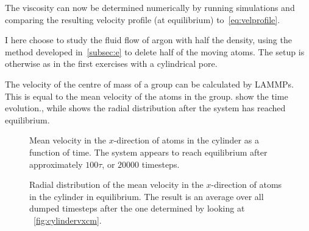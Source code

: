 \documentclass[11pt,british,a4paper]{report}
\begin{document}
The viscosity can now be determined numerically by running simulations and comparing the resulting velocity profile (at equilibrium) to~\vref{eq:velprofile}.

I here choose to study the fluid flow of argon with half the density, using the method developed in~\vref{subsec:e} to delete half of the moving atoms. The setup is otherwise as in the first exercises with a cylindrical pore.

The velocity of the centre of mass of a group can be calculated by LAMMPs. This is equal to the mean velocity of the atoms in the group.  show the time evolution., while  shows the radial distribution after the system has reached equilibrium.
\begin{figure}[tbh]
    \centering
    \caption{Mean velocity in the \(x\)-direction of atoms in the cylinder as a function of time. The system appears to reach equilibrium after approximately \(100\tau\), or \(\num{20000}\) timesteps.}%
    \label{fig:cylindervxcm}
\end{figure}
\begin{figure}[tbh]
    \centering
    \caption{Radial distribution of the mean velocity in the \(x\)-direction of atoms in the cylinder in equilibrium. The result is an average over all dumped timesteps after the one determined by looking at ~\vref{fig:cylindervxcm}.}%
    \label{fig:cylindervx}
\end{figure}






































\nocite{*}
\printbibliography{}
\end{document}
